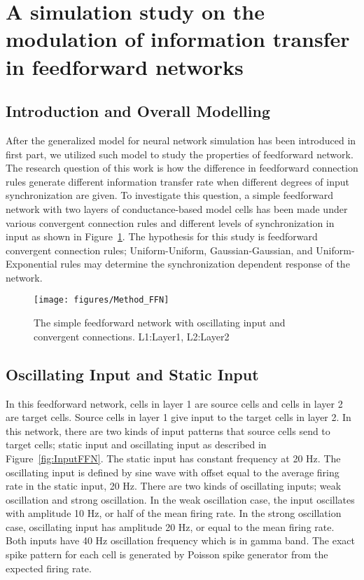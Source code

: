 \section{A simulation study on the modulation of information transfer in feedforward networks}

\subsection{Introduction and Overall Modelling}

After the generalized model for neural network simulation has been introduced in first part, we utilized such model to study the properties of feedforward network. The research question of this work is how the difference in feedforward connection rules generate different information transfer rate when different degrees of input synchronization are given. To investigate this question, a simple feedforward network with two layers of conductance-based model cells has been made under various convergent connection rules and different levels of synchronization in input as shown in Figure~\ref{fig:FFmodel}. The hypothesis for this study is feedforward convergent connection rules; Uniform-Uniform, Gaussian-Gaussian, and Uniform-Exponential rules may determine the synchronization dependent response of the network.
\begin{figure}[!h]
	\centering
	\texttt{[image: figures/Method\_FFN]}
	\caption{The simple feedforward network with oscillating input and convergent connections. L1:Layer1, L2:Layer2}
	\label{fig:FFmodel}
\end{figure} 

\subsection{Oscillating Input and Static Input}
 In this feedforward network, cells in layer 1 are source cells and cells in layer 2 are target cells. Source cells in layer 1 give input to the target cells in layer 2. In this network, there are two kinds of input patterns that source cells send to target cells; static input and oscillating input as described in Figure~\ref{fig:InputFFN}. The static input has constant frequency at 20 Hz. The oscillating input is defined by sine wave with offset equal to the average firing rate in the static input, 20 Hz. There are two kinds of oscillating inputs; weak oscillation and strong oscillation. In the weak oscillation case, the input oscillates with amplitude 10 Hz, or half of the mean firing rate. In the strong oscillation case, oscillating input has amplitude 20 Hz, or equal to the mean firing rate. Both inputs have 40 Hz oscillation frequency which is in gamma band. The exact spike pattern for each cell is generated by Poisson spike generator from the expected firing rate.

